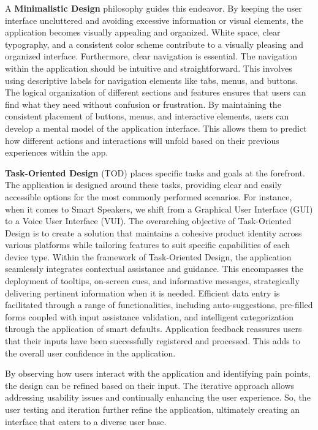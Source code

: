 A \textbf{Minimalistic Design} philosophy guides this endeavor. By keeping the user interface uncluttered and avoiding 
excessive information or visual elements, the application becomes visually appealing and organized. White space, clear 
typography, and a consistent color scheme contribute to a visually pleasing and organized interface.
Furthermore, clear navigation is essential. The navigation within the application should be intuitive and 
straightforward. This involves using descriptive labels for navigation elements like tabs, menus, and buttons. 
The logical organization of different sections and features ensures that users can find what they need without 
confusion or frustration. By maintaining the consistent placement of buttons, menus, and interactive elements, users 
can develop a mental model of the application interface. This allows them to predict how different actions and 
interactions will unfold based on their previous experiences within the app.

\textbf{Task-Oriented Design} (TOD) places specific tasks and goals at the forefront. The application is designed 
around these tasks, providing clear and easily accessible options for the most commonly performed scenarios.
For instance, when it comes to Smart Speakers, we shift from a Graphical User Interface (GUI) to a Voice User Interface 
(VUI). The overarching objective of Task-Oriented Design is to create a solution that maintains a cohesive product 
identity across various platforms while tailoring features to suit specific capabilities of each device type.
Within the framework of Task-Oriented Design, the application seamlessly integrates contextual assistance and guidance. 
This encompasses the deployment of tooltips, on-screen cues, and informative messages, strategically delivering 
pertinent information when it is needed. Efficient data entry is facilitated through a range of functionalities, 
including auto-suggestions, pre-filled forms coupled with input assistance validation, and intelligent categorization 
through the application of smart defaults. Application feedback reassures users that their inputs have been successfully 
registered and processed. This adds to the overall user confidence in the application.

By observing how users interact with the application and identifying pain points, the design can be refined based on 
their input. The iterative approach allows addressing usability issues and continually enhancing the user experience. 
So, the user testing and iteration further refine the application, ultimately creating an interface that caters to a 
diverse user base.

